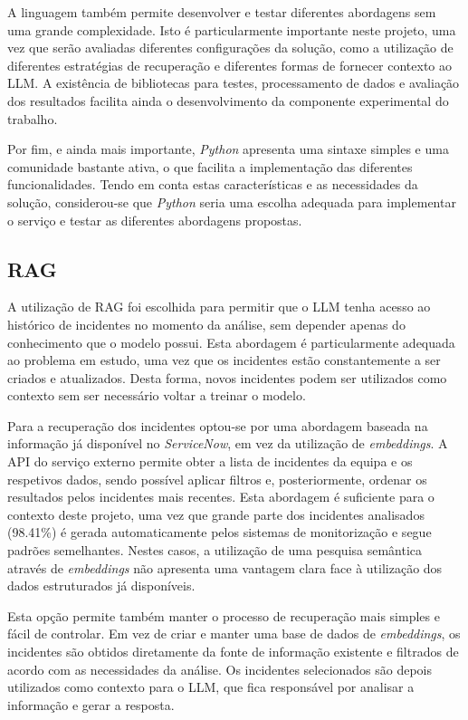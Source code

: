 		A linguagem também permite desenvolver e testar diferentes abordagens sem uma grande complexidade. Isto é particularmente importante neste projeto, uma vez que serão avaliadas diferentes configurações da solução, como a utilização de diferentes estratégias de recuperação e diferentes formas de fornecer contexto ao \gls{LLM}. A existência de bibliotecas para testes, processamento de dados e avaliação dos resultados facilita ainda o desenvolvimento da componente experimental do trabalho.
		
		Por fim, e ainda mais importante, \textit{Python} apresenta uma sintaxe simples e uma comunidade bastante ativa, o que facilita a implementação das diferentes funcionalidades. Tendo em conta estas características e as necessidades da solução, considerou-se que \textit{Python} seria uma escolha adequada para implementar o serviço e testar as diferentes abordagens propostas.
		
	\subsection{RAG}
		A utilização de \gls{RAG} foi escolhida para permitir que o \gls{LLM} tenha acesso ao histórico de incidentes no momento da análise, sem depender apenas do conhecimento que o modelo possui. Esta abordagem é particularmente adequada ao problema em estudo, uma vez que os incidentes estão constantemente a ser criados e atualizados. Desta forma, novos incidentes podem ser utilizados como contexto sem ser necessário voltar a treinar o modelo.
		
		Para a recuperação dos incidentes optou-se por uma abordagem baseada na informação já disponível no \textit{ServiceNow}, em vez da utilização de \textit{embeddings}. A \gls{API} do serviço externo permite obter a lista de incidentes da equipa e os respetivos dados, sendo possível aplicar filtros e, posteriormente, ordenar os resultados pelos incidentes mais recentes. Esta abordagem é suficiente para o contexto deste projeto, uma vez que grande parte dos incidentes analisados (98.41\%) é gerada automaticamente pelos sistemas de monitorização e segue padrões semelhantes. Nestes casos, a utilização de uma pesquisa semântica através de \textit{embeddings} não apresenta uma vantagem clara face à utilização dos dados estruturados já disponíveis.
		
		Esta opção permite também manter o processo de recuperação mais simples e fácil de controlar. Em vez de criar e manter uma base de dados de \textit{embeddings}, os incidentes são obtidos diretamente da fonte de informação existente e filtrados de acordo com as necessidades da análise. Os incidentes selecionados são depois utilizados como contexto para o \gls{LLM}, que fica responsável por analisar a informação e gerar a resposta.
		
